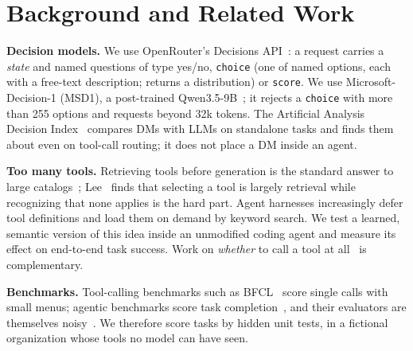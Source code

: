 \documentclass[conference]{IEEEtran}
\newcommand{\msd}{MSD1}
\begin{document}
\section{Background and Related Work}\label{sec:background}
\textbf{Decision models.} We use OpenRouter's Decisions API~\cite{openrouterdecisions}: a request carries a
\emph{state} and named questions of type yes/no, \texttt{choice} (one of named options, each with a free-text
description; returns a distribution) or \texttt{score}. We use Microsoft-Decision-1 (\msd{}), a post-trained
Qwen3.5-9B~\cite{msd1}; it rejects a \texttt{choice} with more than 255 options and requests beyond 32k
tokens. The Artificial Analysis Decision Index~\cite{aa2026decisionindex,olson2026decision} compares DMs with
LLMs on standalone tasks and finds them about even on tool-call routing; it does not place a DM inside an
agent.

\textbf{Too many tools.} Retrieving tools before generation is the standard answer to large
catalogs~\cite{qin2023toolllm,oats2026}; Lee~\cite{selection2026retrieval} finds that selecting a tool is
largely retrieval while recognizing that none applies is the hard part. Agent harnesses increasingly defer
tool definitions and load them on demand by keyword search. We test a learned, semantic version of this idea
inside an unmodified coding agent and measure its effect on end-to-end task success. Work on \emph{whether} to
call a tool at all~\cite{ross2025when2call,qian2025smart,tocall2026,sun2026probe} is complementary.

\textbf{Benchmarks.} Tool-calling benchmarks such as BFCL~\cite{patil2025bfcl} score single calls with small
menus; agentic benchmarks score task completion~\cite{yao2024taubench,mcpatlas2026,toolathlon2025}, and their
evaluators are themselves noisy~\cite{audit2026}. We therefore score tasks by hidden unit tests, in a fictional
organization whose tools no model can have seen.

\end{document}
